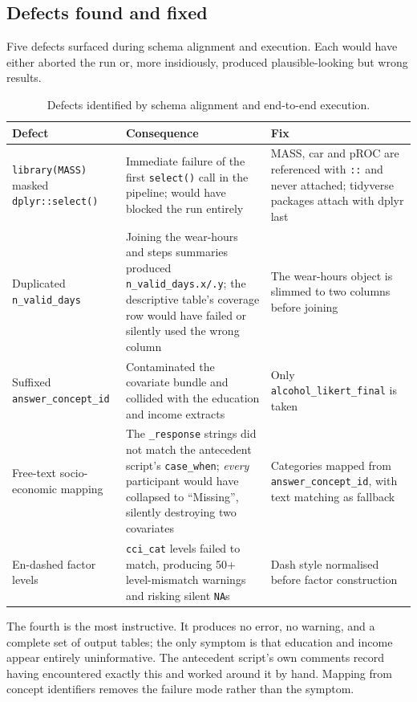 \documentclass[11pt]{article}
\newcommand{\code}[1]{\texttt{\small #1}}
\begin{document}
\subsection{Defects found and fixed}
\label{sec:defects}
Five defects surfaced during schema alignment and execution. Each would have either aborted the run or,
more insidiously, produced plausible-looking but wrong results.

\begin{table}[h]\centering\footnotesize
\begin{tabular}{@{}p{3.6cm}p{4.4cm}p{5.4cm}@{}}
\toprule
\textbf{Defect} & \textbf{Consequence} & \textbf{Fix} \\
\midrule
\code{library(MASS)} masked \code{dplyr::select()} & Immediate failure of the first \code{select()}
call in the pipeline; would have blocked the run entirely & MASS, car and pROC are referenced with
\code{::} and never attached; tidyverse packages attach with dplyr last \\
\addlinespace
Duplicated \code{n_valid_days} & Joining the wear-hours and steps summaries produced
\code{n_valid_days.x/.y}; the descriptive table's coverage row would have failed or silently used the
wrong column & The wear-hours object is slimmed to two columns before joining \\
\addlinespace
Suffixed \code{answer_concept_id} & Contaminated the covariate bundle and collided with the education
and income extracts & Only \code{alcohol_likert_final} is taken \\
\addlinespace
Free-text socio-economic mapping & The \code{*_response} strings did not match the antecedent script's
\code{case_when}; \emph{every} participant would have collapsed to ``Missing'', silently destroying
two covariates & Categories mapped from \code{answer_concept_id}, with text matching as fallback \\
\addlinespace
En-dashed factor levels & \code{cci_cat} levels failed to match, producing 50+ level-mismatch warnings
and risking silent \code{NA}s & Dash style normalised before factor construction \\
\bottomrule
\end{tabular}
\caption{Defects identified by schema alignment and end-to-end execution.}
\label{tab:defects}
\end{table}

\noindent The fourth is the most instructive. It produces no error, no warning, and a complete set of
output tables; the only symptom is that education and income appear entirely uninformative. The
antecedent script's own comments record having encountered exactly this and worked around it by
hand. Mapping from concept identifiers removes the failure mode rather than the symptom.
\end{document}
